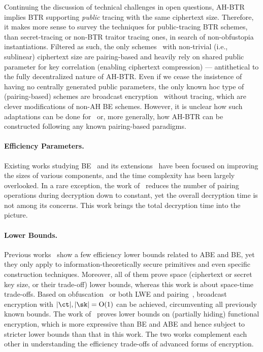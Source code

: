 Continuing the discussion of technical challenges in open questions,
AH-BTR implies BTR supporting \emph{public} tracing
with the same ciphertext size.
Therefore, it makes more sense to survey
the techniques for public-tracing BTR schemes,
than secret-tracing or non-BTR traitor tracing ones,
in search of non-obfustopia instantiations.
Filtered as such,
the only schemes~\cite{CCS:BonWat06,CCS:GKSW10}
with non-trivial (i.e., sublinear) ciphertext size
are pairing-based and
heavily rely on shared public parameter for key correlation
(enabling ciphertext compression)
---
antithetical to the fully decentralized nature of AH-BTR.
Even if we cease
the insistence of having no centrally generated public parameters,
the only known \ad hoc type of (pairing-based) schemes are
broadcast encryption~\cite{CCS:WQZD10,KolMalWee23} without tracing,
which are clever modifications of non-AH BE schemes.
However, it is unclear
how such adaptations can be done for~\cite{CCS:BonWat06,CCS:GKSW10}
or, more generally,
how AH-BTR can be constructed following any known pairing-based paradigms.

\paragraph{Efficiency Parameters.}
Existing works studying
BE~\cite{C:FiaNao93,C:BonGenWat05,EC:GenWat09,C:BonWatZha14,EC:AgrYam20,TCC:AgrWicYam20,EPRINT:BraVai20,C:Zhandry20,EC:Wee22}
and
its extensions~\cite{PAIRING:DelPaiPoi07,AC:Delerablee07,EPRINT:SakFur07,C:BonZha14}
have been focused on improving the sizes of various components,
and the time complexity has been largely overlooked.
In a rare exception,
the work of~\cite{PKC:AttLib10}
reduces the number of pairing operations during decryption down to constant,
yet the overall decryption time is not among its concerns.
This work brings the total decryption time into the picture.

\paragraph{Lower Bounds.}
Previous works~\cite{EC:BluCre94,EC:LubSta98,AC:KYDB98,AFRICACRYPT:AusKre08,AC:KatYer09,C:GayKerWee15,ITC:DLY21} show a few efficiency lower bounds related to ABE and BE,
yet they only apply to information-theoretically secure primitives and even specific construction techniques.
Moreover, all of them prove space (ciphertext or secret key size, or their trade-off) lower bounds, whereas
this work is about space-time trade-offs.
Based on obfuscation~\cite{C:BonWatZha14} or both LWE and pairing~\cite{EC:AgrYam20}, broadcast encryption with ${|\ct|,|\sk|=\bigO(1)}$ can be achieved,
circumventing all previously known bounds.
The work of~\cite{EC:JaiLinLuo23}
proves lower bounds
on (partially hiding) functional encryption,
which is more expressive than BE and ABE and
hence subject to stricter lower bounds than that in this work.
The two works complement each other
in understanding the efficiency trade-offs of advanced forms of encryption.

